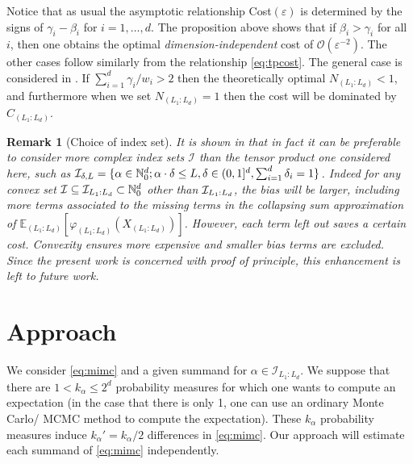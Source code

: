 \documentclass[english]{article}
\newtheorem{rem}{Remark}[section]
\newcommand{\cO}{\mathcal{O}}
\newcommand{\cI}{{\cal I}}
\begin{document}
Notice that as usual the asymptotic relationship Cost$(\varepsilon)$ 
is determined by the signs of $\gamma_i-\beta_i$ for $i=1,\dots,d$.  
The proposition above shows that if $\beta_i>\gamma_i$ for all $i$, 
then one obtains the optimal {\it dimension-independent} 
cost of $\cO(\varepsilon^{-2})$.  
The other cases follow similarly from the relationship \eqref{eq:tpcost}.
The general case is considered in \cite{mimc}.  
If $\sum_{i=1}^d \gamma_i/w_i > 2$ 
then the theoretically optimal $N_{(L_1:L_d)}<1$,
and furthermore when we set $N_{(L_1:L_d)}=1$
then the cost will be dominated by $C_{(L_1:L_d)}$.

\begin{rem}[Choice of index set]
It is shown in \cite{mimc} that in fact it can be preferable 
to consider more complex index sets $\mathcal{I}$ 
than the tensor product one considered here, such
as $\cI_{\delta,L} =
\{\alpha \in  \mathbb{N}_0^d ; \alpha \cdot \delta \leq L, \delta \in (0,1]^d, \sum_{i=1}^d \delta_i =1 \}$. 
Indeed for any convex set $\cI \subseteq \cI_{ L_1:L_d} \subset \mathbb{N}_0^d$
other than $\cI_{ L_1:L_d}$, the bias will be larger, 
including more terms associated to the missing terms in the collapsing sum approximation
of $\mathbb{E}_{(L_1:L_d)}[\varphi_{(L_1:L_d)}(X_{(L_1:L_d)})]$.
However, each term left out saves a certain cost.  
Convexity ensures more expensive and smaller bias terms are excluded.
Since the present work is concerned with proof of principle,
this enhancement is left to future work.
\end{rem}









\section{Approach}
\label{sec:approach}

We consider \eqref{eq:mimc} and a given summand for $\alpha\in\mathcal{I}_{L_1:L_d}$. 
We suppose that there are
$1<k_{\alpha}\leq 2^d$ probability measures for which one wants to compute an expectation 
(in the case that there is only 1, one can use an ordinary Monte Carlo/ MCMC method 
to compute the expectation). 
These $k_{\alpha}$ probability measures induce $k_{\alpha}'=k_\alpha/2$ 
differences in \eqref{eq:mimc}.  
Our approach will estimate each summand of \eqref{eq:mimc}  independently.
\end{document}
